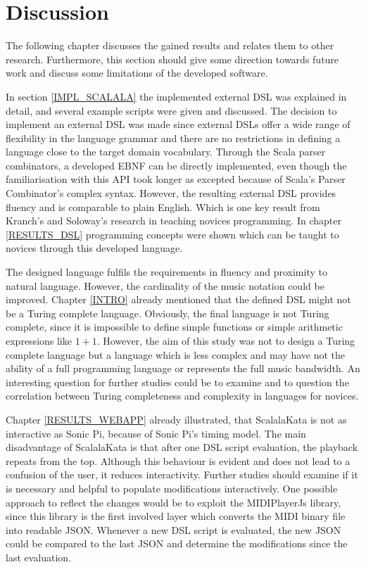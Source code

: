 \chapter{Discussion}
\label{DISCUSSION}
The following chapter discusses the gained results and relates them to other research. Furthermore, this section should give some direction towards future work and discuss some limitations of the developed software.

In section \ref{IMPL_SCALALA} the implemented external DSL was explained in detail, and several example scripts were given and discussed. The decision to implement an external DSL was made since external DSLs offer a wide range of flexibility in the language grammar and there are no restrictions in defining a language close to the target domain vocabulary. Through the Scala parser combinators, a developed EBNF can be directly implemented, even though the familiarisation with this API took longer as excepted because of Scala's Parser Combinator's complex syntax. However, the resulting external DSL provides fluency and is comparable to plain English. Which is one key result from Kranch's\cite{Kranch2012} and Soloway's\cite{Soloway1982, Bonar1985} research in teaching novices programming. In chapter \ref{RESULTS_DSL} programming concepts were shown which can be taught to novices through this developed language.

The designed language fulfils the requirements in fluency and proximity to natural language. However, the cardinality of the music notation could be improved. Chapter \ref{INTRO} already mentioned that the defined DSL might not be a Turing complete language. Obviously, the final language is not Turing complete, since it is impossible to define simple functions or simple arithmetic expressions like $1 + 1$. However, the aim of this study was not to design a Turing complete language but a language which is less complex and may have not the ability of a full programming language or represents the full music bandwidth. An interesting question for further studies could be to examine and to question the correlation between Turing completeness and complexity in languages for novices.

Chapter \ref{RESULTS_WEBAPP} already illustrated, that ScalalaKata is not as interactive as Sonic Pi, because of Sonic Pi's timing model. The main disadvantage of ScalalaKata is that after one DSL script evaluation, the playback repeats from the top. Although this behaviour is evident and does not lead to a confusion of the user, it reduces interactivity. Further studies should examine if it is necessary and helpful to populate modifications interactively. One possible approach to reflect the changes would be to exploit the MIDIPlayerJs library, since this library is the first involved layer which converts the MIDI binary file into readable JSON. Whenever a new DSL script is evaluated, the new JSON could be compared to the last JSON and determine the modifications since the last evaluation.

